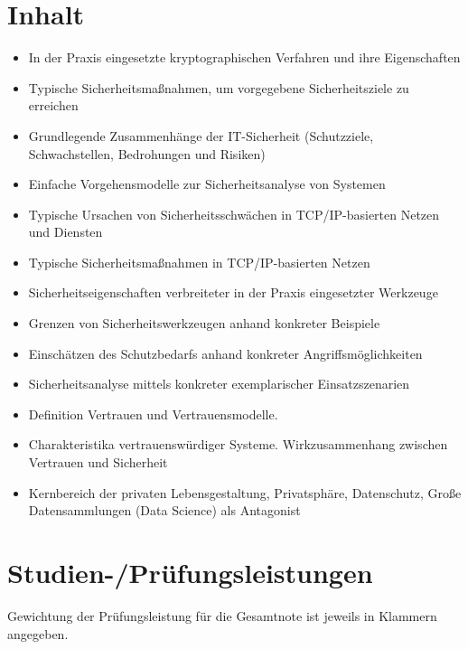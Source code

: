 \section*{Inhalt\label{/mi-2017/modulbeschreibungen-master/MA_WTW_Modul_IT-Sicherheit}}\label{inhaltpathlabelmi-2017modulbeschreibungen-mastermaux5fwtwux5fmodulux5fit-sicherheit}

\begin{itemize}
\tightlist
\item
  In der Praxis eingesetzte kryptographischen Verfahren und ihre
  Eigenschaften
\item
  Typische Sicherheitsmaßnahmen, um vorgegebene Sicherheitsziele zu
  erreichen
\item
  Grundlegende Zusammenhänge der IT-Sicherheit (Schutzziele,
  Schwachstellen, Bedrohungen und Risiken)
\item
  Einfache Vorgehensmodelle zur Sicherheitsanalyse von Systemen
\item
  Typische Ursachen von Sicherheitsschwächen in TCP/IP-basierten Netzen
  und Diensten
\item
  Typische Sicherheitsmaßnahmen in TCP/IP-basierten Netzen
\item
  Sicherheitseigenschaften verbreiteter in der Praxis eingesetzter
  Werkzeuge
\item
  Grenzen von Sicherheitswerkzeugen anhand konkreter Beispiele
\item
  Einschätzen des Schutzbedarfs anhand konkreter Angriffsmöglichkeiten
\item
  Sicherheitsanalyse mittels konkreter exemplarischer Einsatzszenarien
\item
  Definition Vertrauen und Vertrauensmodelle.
\item
  Charakteristika vertrauenswürdiger Systeme. Wirkzusammenhang zwischen
  Vertrauen und Sicherheit
\item
  Kernbereich der privaten Lebensgestaltung, Privatsphäre, Datenschutz,
  Große Datensammlungen (Data Science) als Antagonist
\end{itemize}

\section*{Studien-/Prüfungsleistungen\label{/mi-2017/modulbeschreibungen-master/MA_WTW_Modul_IT-Sicherheit}}\label{studien-pruxfcfungsleistungenpathlabelmi-2017modulbeschreibungen-mastermaux5fwtwux5fmodulux5fit-sicherheit}

Gewichtung der Prüfungsleistung für die Gesamtnote ist jeweils in
Klammern angegeben.

